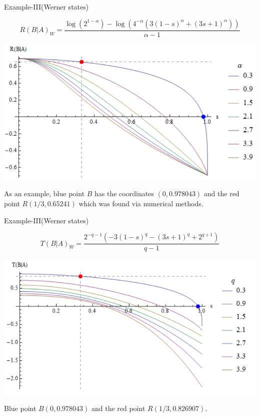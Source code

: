 \documentclass{beamer}
\begin{document}
\begin{frame}{Example-III(Werner states)}
\begin{scriptsize}
$$
R(B|A)_{W}=
\frac{\log \left(2^{1-\alpha }\right)-\log \left(4^{-\alpha } \left(3 (1-s)^{\alpha }+(3 s+1)^{\alpha }\right)\right)}{\alpha -1}
$$
\begin{center}
\includegraphics[scale=0.5]{figures/conditional_renyi_werner.png}
\end{center}
As an example, blue point $B$ has the coordinates $(0,0.978043)$ and the red point $R(1/3,0.65241)$ which was found via numerical methods.
\end{scriptsize}
\end{frame}

\begin{frame}{Example-III(Werner states)}
\begin{scriptsize}
$$
T(B|A)_{W}= \frac{2^{-q-1} \left(-3 (1-s)^q-(3 s+1)^q+2^{q+1}\right)}{q-1}
$$
\begin{center}
\includegraphics[scale=0.5]{figures/conditional_tsallis_werner.png}
\end{center}
Blue point $B(0,0.978043)$ and the red point $R(1/3,0.826907)$.
\end{scriptsize}
\end{frame}
\end{document}
